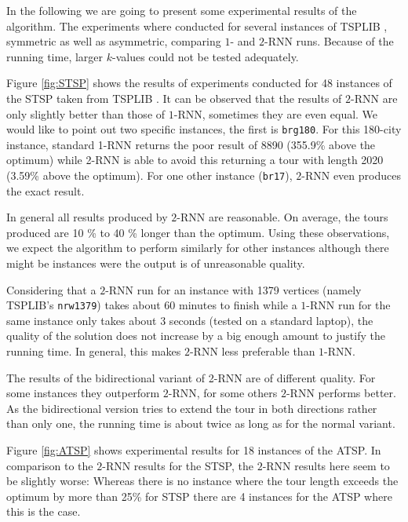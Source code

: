 In the following we are going to present some experimental results of the algorithm. The experiments where conducted for several instances of TSPLIB \cite{REINELT1995}, symmetric as well as asymmetric, comparing $1$- and $2$-RNN runs.
Because of the running time, larger $k$-values could not be tested adequately.



Figure \ref{fig:STSP} shows the results of experiments conducted for 48 instances of the STSP taken from TSPLIB \cite{REINELT1995}.
It can be observed that the results of $2$-RNN are only slightly better than those of $1$-RNN, sometimes they are even equal.
We would like to point out two specific instances, the first is \texttt{brg180}.
For this 180-city instance, standard 1-RNN returns the poor result of 8890 (355.9\% above the optimum) while 2-RNN is able to avoid this returning a tour with length 2020 (3.59\% above the optimum).
For one other instance (\texttt{br17}), $2$-RNN even produces the exact result.

In general all results produced by $2$-RNN are reasonable. 
On average, the tours produced are 10 \% to 40 \% longer than the optimum.
Using these observations, we expect the algorithm to perform similarly for other instances although there might be instances were the output is of unreasonable quality.

Considering that a $2$-RNN run for an instance with 1379 vertices (namely TSPLIB's \texttt{nrw1379}) takes about 60 minutes to finish while a $1$-RNN run for the same instance only takes about 3 seconds (tested on a standard laptop), the quality of the solution does not increase by a big enough amount to justify the running time.
In general, this makes $2$-RNN less preferable than $1$-RNN.

The results of the bidirectional variant of 2-RNN are of different quality. For some instances they outperform $2$-RNN, for some others $2$-RNN performs better.
As the bidirectional version tries to extend the tour in both directions rather than only one, the running time is about twice as long as for the normal variant.



Figure \ref{fig:ATSP} shows experimental results for 18 instances of the ATSP.
In comparison to the $2$-RNN results for the STSP, the $2$-RNN results here seem to be slightly worse:
Whereas there is no instance where the tour length exceeds the optimum by more than 25\% for STSP there are 4 instances for the ATSP where this is the case.
